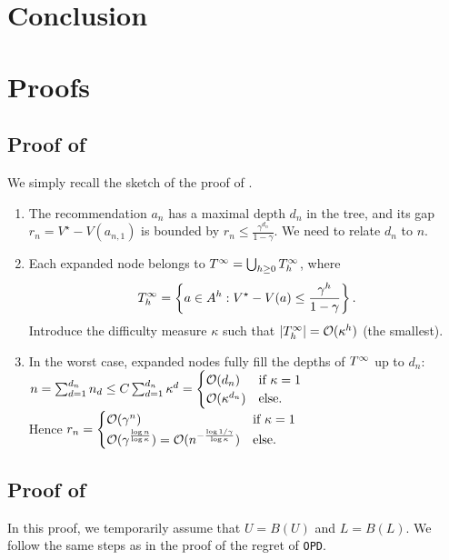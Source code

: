 \documentclass[runningheads]{llncs}
\begin{document}
\section*{Conclusion}





\clearpage
\appendix

\section{Proofs}
\subsection{Proof of }
We simply recall the sketch of the proof of \citet{hren2008optimistic}.\\

\begin{enumerate}
	\item The recommendation $a_n$ has a maximal depth $d_n$ in the tree, and its gap $r_n = V^\star - V({a_{n,1}})$ is bounded by $r_n \leq \frac{\gamma^{d_n}}{1-\gamma}$. We need to relate $d_n$ to $n$.
	
	\item Each expanded node belongs to $T^\infty = \bigcup_{h\geq 0} T_h^\infty$, where $$T_h^\infty = \left\{a\in A^h: V^\star-V(a) \leq \frac{\gamma^h}{1-\gamma}\right\}.$$ Introduce the difficulty measure $\kappa$ such that $|T_h^\infty| = \mathcal{O}(\kappa^h)$ (the smallest).
	
	\item In the worst case, expanded nodes fully fill the depths of $T^\infty$ up to $d_n$: $n = \sum_{d=1}^{d_n} n_d \leq  C\sum_{d=1}^{d_n} \kappa^d = \begin{cases}
	\mathcal{O}(d_n) &\text{if $\kappa=1$}\\
	\mathcal{O}(\kappa^{d_n}) &\text{else.}
	\end{cases}$\\
	Hence $r_n = \begin{cases}
	\mathcal{O}(\gamma^n) &\text{if $\kappa=1$}\\
	\mathcal{O}(\gamma^{\frac{\log n}{\log \kappa}}) = \mathcal{O}(n^{-\frac{\log 1/\gamma}{\log \kappa}}) &\text{else.}
	\end{cases}$
\end{enumerate}

\subsection{Proof of }
In this proof, we temporarily assume that $U=B(U)$ and $L=B(L)$. We follow the same steps as in the proof of the regret of \texttt{OPD}.
\end{document}
